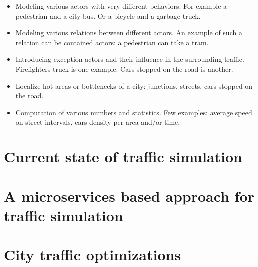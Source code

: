 \documentclass[a4paper,12pt,twoside]{book}
\begin{document}
\begin{itemize}
    \item Modeling various actors with very different behaviors. For example a pedestrian and a city bus. Or a bicycle and a garbage truck.
    \item Modeling various relations between different actors. An example of such a relation can be contained actors: a pedestrian can take a tram.
    \item Introducing exception actors and their influence in the surrounding traffic. Firefighters truck is one example. Cars stopped on the road is another.
    \item Localize hot areas or bottlenecks of a city: junctions, streets, cars stopped on the road.
    \item Computation of various numbers and statistics. Few examples: average speed on street intervals, cars density per area and/or time, 
\end{itemize}

\section{Current state of traffic simulation}

\section{A microservices based approach for traffic simulation}
\label{sec:microservicesbasedapproachtrafficsim}

\section{City traffic optimizations}
\label{sec:citytrafficoptimizations}
\end{document}
